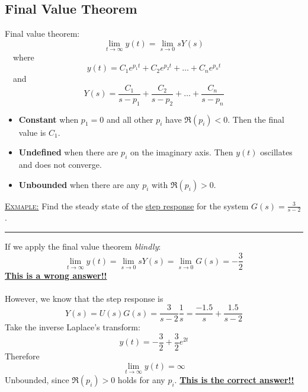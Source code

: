 \documentclass[12pt,a4paper]{article}
\begin{document}
\subsection{Final Value Theorem}
Final value theorem:
\[\lim_{t\to \infty}y(t) = \lim_{s\to 0}sY(s)\]
\ \ where 
\[y(t) = C_{1}e^{p_{1}t} +  C_{2}e^{p_{2}t}+ \ldots +  C_{n}e^{p_{n}t}\]
\ \ and 
\[Y(s) = \frac{C_{1}}{s-p_{1}}+\frac{C_{2}}{s-p_{2}}+\ldots+\frac{C_{n}}{s-p_{n}}\]
\begin{itemize}
\item \textbf{Constant} when $p_{1}=0$ and all other $p_{i}$ have $\Re (p_{i})<0$. Then the final value is $C_{1}$.
\item \textbf{Undefined} when there are $p_{i}$ on the imaginary axis. Then $y(t)$ oscillates and does not converge.
\item \textbf{Unbounded} when there are any $p_{i}$ with $\Re (p_{i})>0$.
\end{itemize}

\begin{tcolorbox}[breakable]
\underline{\textsc{Exmaple:}} Find the steady state of the \underline{step response} for the system $G(s)=\frac{3}{s-2}$.
\vspace{.3cm} \hrule \vspace{.3cm}
If we apply the final value theorem \textit{blindly}:
\[\lim_{t\to \infty}y(t) = \lim_{s\to 0}sY(s)=\lim_{s\to 0}G(s)=-\frac{3}{2}\]
\underline{\textbf{This is a wrong answer!!}}
\\\\
However, we know that the step response is
\[Y(s) =U(s)G(s)= \frac{3}{s-2}\frac{1}{s}=\frac{-1.5}{s}+\frac{1.5}{s-2}\]
Take the inverse Laplace's transform:
\[y(t) = -\frac{3}{2}+\frac{3}{2}e^{2t}\]
Therefore
\[\lim_{t\to \infty}y(t) = \infty\]
Unbounded, since $\Re (p_{i})>0$ holds for any $p_{i}$.
\underline{\textbf{This is the correct answer!!}}
\end{tcolorbox}

\newpage
\end{document}
